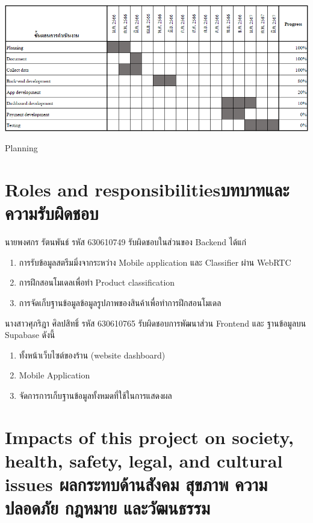     \begin{table}[h]
        \begin{center}
        \vspace{0.5cm}\includegraphics[scale=0.64]{pic/plane.png}
        \end{center}
        
        \caption[Planning]{Planning}
        \label{table:Planning}
        \end{table}

\newpage
\section{\ifenglish Roles and responsibilities\else บทบาทและความรับผิดชอบ\fi}
นายพงศกร รัตนพันธ์ รหัส 630610749 รับผิดชอบในส่วนของ Backend ได้แก่

\begin{enumerate}
    \item การรับข้อมูลสตรีมมิ่งจากระหว่าง Mobile application และ  Classifier ผ่าน WebRTC
    \item การฝึกสอนโมเดลเพื่อทำ Product classification
    \item การจัดเก็บฐานข้อมูลข้อมูลรูปภาพของสินค้าเพื่อทำการฝึกสอนโมเดล
\end{enumerate}


นางสาวศุภริฎา  ศิลปสิทธิ์ รหัส  630610765 รับผิดชอบการพัฒนาส่วน Frontend และ ฐานข้อมูลบน Supabase ดังนี้
\begin{enumerate}
    \item ทั้งหน้าเว็บไซต์ของร้าน (website dashboard) 
    \item Mobile Application
    \item จัดการการเก็บฐานข้อมูลทั้งหมดที่ใช้ในการแสดงผล
\end{enumerate}
\section{\ifenglish%
Impacts of this project on society, health, safety, legal, and cultural issues
\else%
ผลกระทบด้านสังคม สุขภาพ ความปลอดภัย กฎหมาย และวัฒนธรรม
\fi}

